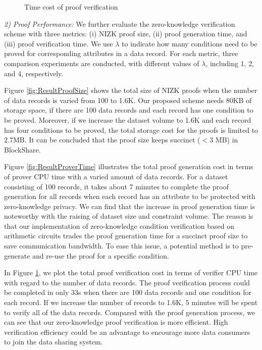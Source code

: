 \documentclass[11pt,divpdfm]{article}
\begin{document}
\begin{figure}[t]
\begin{minipage}[b]{0.4\textwidth}
		\caption{Time cost of proof verification}
		\label{fig:ResultVerifierTime}
	\end{minipage}
\end{figure}


\emph{2) Proof Performance:}
We further evaluate the zero-knowledge verification scheme with three metrics: (i) NIZK proof size, (ii) proof generation time, and (iii) proof verification time.
We use $\lambda$ to indicate how many conditions need to be proved for corresponding attributes in a data record.
For each metric, three comparison experiments are conducted, with different values of $\lambda$, including 1, 2, and 4, respectively.

Figure \ref{fig:ResultProofSize} shows the total size of NIZK proofs when the number of data records is varied from 100 to 1.6K.
Our proposed scheme needs 80KB of storage space, if there are 100 data records and each record has one condition to be proved.
Moreover, if we increase the dataset volume to 1.6K and each record has four conditions to be proved, the total storage cost for the proofs is limited to 2.7MB.
It can be concluded that the proof size keeps succinct ($< 3$ MB) in BlockShare.

Figure \ref{fig:ResultProverTime} illustrates the total proof generation cost in terms of prover CPU time with a varied amount of data records.
For a dataset consisting of 100 records, it takes about 7 minutes to complete the proof generation for all records when each record has an attribute to be protected with zero-knowledge privacy.
We can find that the increase in proof generation time is noteworthy with the raising of dataset size and constraint volume.
The reason is that our implementation of zero-knowledge condition verification based on arithmetic circuits trades the proof generation time for a succinct proof size to save communication bandwidth.
To ease this issue, a potential method is to pre-generate and re-use the proof for a specific condition.

In Figure \ref{fig:ResultVerifierTime}, we plot the total proof verification cost in terms of verifier CPU time with regard to the number of data records.
The proof verification process could be completed in only 33s when there are 100 data records and one condition for each record.
If we increase the number of records to 1.6K, 5 minutes will be spent to verify all of the data records.
Compared with the proof generation process, we can see that our zero-knowledge proof verification is more efficient.
High verification efficiency could be an advantage to encourage more data consumers to join the data sharing system.
\end{document}
